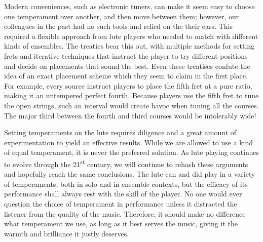 Modern conveniences, such as electronic tuners, can make it seem easy to choose one temperament over
another, and then move between them; however, our colleagues in the past had no such tools and
relied on the their ears.  This required a flexible approach from lute players who needed to match
with different kinds of ensembles.  The treaties bear this out, with multiple methods for setting
frets and iterative techniques that instruct the player to try different positions and decide on
placements that sound the best.  Even these treatises  confute the idea of an exact placement scheme
which they seem to claim in the first place. For example, every source instruct players to place the
fifth fret at a pure ratio, making it an untempered perfect fourth.  Because players use the fifth
fret to tune the open strings, such an interval would create havoc when tuning all the courses. The
major third between the fourth and third courses would be intolerably wide!

Setting temperaments on the lute requires diligence and a great amount of experimentation to yield
an effective results.  While we are allowed to use a kind of equal temperament, it is never the
preferred solution.  As lute playing continues to evolve through the 21\textsuperscript{st} century,
we will continue to rehash these arguments and hopefully reach the same conclusions. The lute can
and did play in a variety of temperaments, both in solo and in ensemble contexts, but the efficacy
of its performance shall always rest with the skill of the player. No one would ever question the
choice of temperament in performance unless it distracted the listener from the quality of the
music.  Therefore, it should make no difference what temperament we use, as long as it best serves
the music, giving it the warmth and brilliance it justly deserves.
